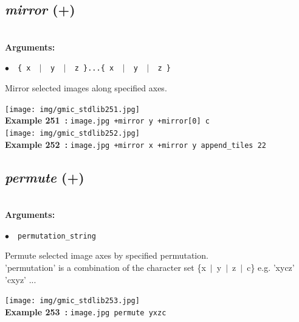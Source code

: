 \documentclass[a4paper,10.5pt,twoside]{book}
\def\comma{\discretionary{,}{}{,}}
\newcommand{\Cb}[1]{\textcolor{cb}{#1}}
\begin{document}
\subsection{\emph{mirror} (+)}\vspace*{-0.7em}
~\\\textbf{\Cb{Arguments: }}\begin{flushleft}
{\small \Cb{\hspace*{0.5cm}$\bullet$~~\texttt{\{ x ~$|$~ y ~$|$~ z \}...\{ x ~$|$~ y ~$|$~ z \}}}}\end{flushleft}
Mirror selected images along specified axes.
\begin{center}\texttt{[image: img/gmic\_stdlib251.jpg]}\\
{\footnotesize \textbf{Example 251~:} \texttt{image.jpg +mirror y +mirror[0] c}}
\\\texttt{[image: img/gmic\_stdlib252.jpg]}\\
{\footnotesize \textbf{Example 252~:} \texttt{image.jpg +mirror x +mirror y append\_tiles 2{\comma}2}}
\end{center}

\subsection{\emph{permute} (+)}\vspace*{-0.7em}
~\\\textbf{\Cb{Arguments: }}\begin{flushleft}
{\small \Cb{\hspace*{0.5cm}$\bullet$~~\texttt{permutation\_string}}}\end{flushleft}
Permute selected image axes by specified permutation.
~\\'permutation' is a combination of the character set \{x~$|$~y~$|$~z~$|$~c\}{\comma}
e.g. 'xycz'{\comma} 'cxyz'{\comma} ...
\begin{center}\texttt{[image: img/gmic\_stdlib253.jpg]}\\
{\footnotesize \textbf{Example 253~:} \texttt{image.jpg permute yxzc}}
\end{center}
\end{document}
